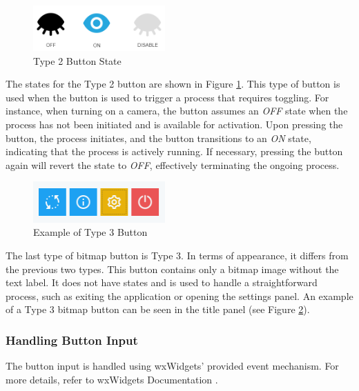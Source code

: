 \begin{figure}[!ht]
    \centering
    \includegraphics[width=0.45\textwidth]{texs/Part2/chapter4/image/type2state.png}
    \caption{Type 2 Button State}
    \label{fig:type2_state}
\end{figure}

The states for the Type 2 button are shown in Figure \ref{fig:type2_state}. This type of button is used when the button is used to trigger a process that requires toggling. For instance, when turning on a camera, the button assumes an \textit{OFF} state when the process has not been initiated and is available for activation. Upon pressing the button, the process initiates, and the button transitions to an \textit{ON} state, indicating that the process is actively running. If necessary, pressing the button again will revert the state to \textit{OFF}, effectively terminating the ongoing process.

\begin{figure}[!ht]
    \centering
    \includegraphics[width=0.45\textwidth]{texs/Part2/chapter4/image/type3state.png}
    \caption{Example of Type 3 Button}
    \label{fig:type3_state}
\end{figure}

The last type of bitmap button is Type 3. In terms of appearance, it differs from the previous two types. This button contains only a bitmap image without the text label. It does not have states and is used to handle a straightforward process, such as exiting the application or opening the settings panel. An example of a Type 3 bitmap button can be seen in the title panel (see Figure \ref{fig:type3_state}).

\subsubsection{Handling Button Input}
\label{subsubsec:handling_button_input}
The button input is handled using wxWidgets' provided event mechanism. For more details, refer to wxWidgets Documentation \cite{wxWidgetsEvent}.

